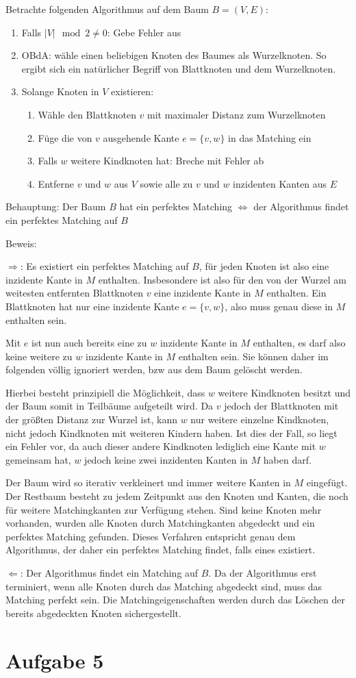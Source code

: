 \documentclass[a4paper]{article}
\begin{document}
Betrachte folgenden Algorithmus auf dem Baum $B = (V, E)$:
\begin{enumerate}
\item Falls $|V| \mod 2 \neq 0$: Gebe Fehler aus
\item OBdA: wähle einen beliebigen Knoten des Baumes als Wurzelknoten. So
ergibt sich ein natürlicher Begriff von Blattknoten und dem Wurzelknoten.
\item Solange Knoten in $V$ existieren:
	\begin{enumerate}
	\item Wähle den Blattknoten $v$ mit maximaler Distanz zum Wurzelknoten
	\item Füge die von $v$ ausgehende Kante $e = \{v, w\}$ in das Matching ein
	\item Falls $w$ weitere Kindknoten hat: Breche mit Fehler ab
	\item Entferne $v$ und $w$ aus $V$ sowie alle zu $v$ und $w$ inzidenten
	Kanten aus $E$
	\end{enumerate}
\end{enumerate}

Behauptung: Der Baum $B$ hat ein perfektes Matching $\Leftrightarrow$ der
Algorithmus findet ein perfektes Matching auf $B$

Beweis:

$\Rightarrow$: Es existiert ein perfektes Matching auf $B$, für jeden Knoten
ist also eine inzidente Kante in $M$ enthalten. Insbesondere ist also für
den von der Wurzel am weitesten entfernten Blattknoten $v$ eine inzidente Kante
in $M$ enthalten. Ein Blattknoten hat nur eine inzidente Kante $e = \{v, w\}$, also muss
genau diese in $M$ enthalten sein.

Mit $e$ ist nun auch bereits eine zu $w$ inzidente Kante in $M$ enthalten,
es darf also keine weitere zu $w$ inzidente Kante in $M$ enthalten sein.
Sie können daher im folgenden völlig ignoriert werden, bzw aus dem Baum
gelöscht werden.

Hierbei besteht prinzipiell die Möglichkeit, dass $w$ weitere Kindknoten
besitzt und der Baum somit in Teilbäume aufgeteilt wird. Da $v$ jedoch der
Blattknoten mit der größten Distanz zur Wurzel ist, kann $w$ nur weitere
einzelne Kindknoten, nicht jedoch Kindknoten mit weiteren Kindern haben.
Ist dies der Fall, so liegt ein Fehler vor, da auch dieser andere Kindknoten
lediglich eine Kante mit $w$ gemeinsam hat, $w$ jedoch keine zwei inzidenten
Kanten in $M$ haben darf.

Der Baum wird so iterativ verkleinert und immer weitere Kanten in $M$
eingefügt. Der Restbaum besteht zu jedem Zeitpunkt aus den Knoten und
Kanten, die noch für weitere Matchingkanten zur Verfügung stehen.
Sind keine Knoten mehr vorhanden, wurden alle Knoten durch Matchingkanten
abgedeckt und ein perfektes Matching gefunden.
Dieses Verfahren entspricht genau dem Algorithmus, der daher ein perfektes
Matching findet, falls eines existiert.

$\Leftarrow$: Der Algorithmus findet ein Matching auf $B$. Da der
Algorithmus erst terminiert, wenn alle Knoten durch das Matching abgedeckt
sind, muss das Matching perfekt sein. Die Matchingeigenschaften werden durch
das Löschen der bereits abgedeckten Knoten sichergestellt.

\section{Aufgabe 5}
\end{document}
